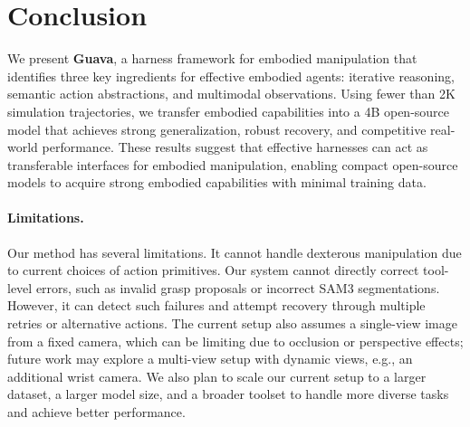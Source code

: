 \section{Conclusion}
\label{sec:conclusion}

We present \textbf{Guava}, a harness framework for embodied manipulation that identifies three key ingredients for effective embodied agents: iterative reasoning, semantic action abstractions, and multimodal observations. Using fewer than 2K simulation trajectories, we transfer embodied capabilities into a 4B open-source model that achieves strong generalization, robust recovery, and competitive real-world performance. These results suggest that effective harnesses can act as transferable interfaces for embodied manipulation, enabling compact open-source models to acquire strong embodied capabilities with minimal training data.

\paragraph{Limitations.} 
Our method has several limitations. It cannot handle dexterous manipulation due to current choices of action primitives. 
Our system cannot directly correct tool-level errors, such as invalid grasp proposals or incorrect SAM3 segmentations. However, it can detect such failures and attempt recovery through multiple retries or alternative actions.
The current setup also assumes a single-view image from a fixed camera, which can be limiting due to occlusion or perspective effects; future work may explore a multi-view setup with dynamic views, e.g., an additional wrist camera. 
We also plan to scale our current setup to a larger dataset, a larger model size, and a broader toolset to handle more diverse tasks and achieve better performance.